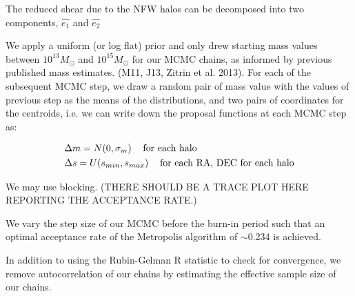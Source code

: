The reduced shear due to the NFW halos can be
decomposed into two components, $\hat{e_1}$ and $\hat{e_2}$  

We apply a uniform (or log flat) prior and only drew starting mass values between
$10^{13} M_\odot$ and $10^{15} M_\odot$ for our MCMC
chains, as informed by previous published mass estimates. (M11, J13, Zitrin
et al. 2013). For each of the subsequent MCMC step, we 
draw a random pair of mass value with the values of
previous step as the means of the distributions, and two pairs of
coordinates for the centroids, i.e. we can write down the
proposal functions at each MCMC step as: 

\begin{align}
	&\Delta m = N(0, \sigma_m) \hspace{1pc} \text{for each halo} \\
	&\Delta s = U(s_{min}, s_{max}) \hspace{1pc} \text{for each RA, DEC for
	each halo}
\end{align}






We may use blocking. 
(THERE SHOULD BE A TRACE PLOT HERE REPORTING THE ACCEPTANCE RATE.)

We vary the step size of our MCMC  before the burn-in period such that an
optimal acceptance rate of the Metropolis algorithm of $\sim0.234$ \citep{Roberts97} is achieved.

In addition to using the Rubin-Gelman R statistic to check for convergence,
we remove autocorrelation of our chains by estimating the effective sample
size of our chains.
 
